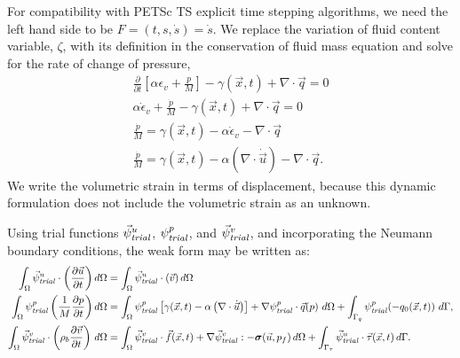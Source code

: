 For compatibility with PETSc TS explicit time stepping algorithms, we
need the left hand side to be $F = (t,s,\dot{s}) = \dot{s}$. We
replace the variation of fluid content variable, $\zeta$, with its
definition in the conservation of fluid mass equation and solve for
the rate of change of pressure,
\begin{gather}
  \frac{\partial}{\partial t}\left[\alpha \epsilon_{v} + \frac{p}{M}\right] - \gamma\left(\vec{x},t\right) + \nabla \cdot \vec{q} = 0 \\
  \alpha \dot{\epsilon}_{v} + \frac{\dot{p}}{M} - \gamma \left(\vec{x},t\right) + \nabla \cdot \vec{q} = 0 \\
  \frac{\dot{p}}{M} = \gamma \left(\vec{x},t \right) - \alpha \dot{\epsilon}_{v} -\nabla \cdot \vec{q} \\
  \frac{\dot{p}}{M} = \gamma \left(\vec{x},t \right) - \alpha \left( \nabla \cdot \dot{\vec{u}} \right) -\nabla \cdot \vec{q}.
\end{gather}
We write the volumetric strain in terms of displacement, because this
dynamic formulation does not include the volumetric strain as an
unknown.

Using trial functions $\trialvec[u]$, $\trialscalar[p]$, and $\trialvec[v]$, and incorporating the
Neumann boundary conditions, the weak form may be written as:
\begin{align}
  \int_{\Omega} \trialvec[u] \cdot \left( \frac{\partial \vec{u}}{\partial t} \right)d \Omega   & = \int_{\Omega} \trialvec[u] \cdot \left( \vec{v} \right) d \Omega          \\
  \int_{\Omega} \trialscalar[p] \left( \frac{1}{M}\frac{\partial p}{\partial t} \right) d\Omega & =
  \int_{\Omega} \trialscalar[p] \left[\gamma(\vec{x},t) - \alpha \left(\nabla \cdot \dot{\vec{u}}\right) \right]  + \nabla \trialscalar[p] \cdot \vec{q}(p) \ d\Omega +
  \int_{\Gamma_q} \trialscalar[p] (-q_0(\vec{x},t)) \ d\Gamma,                                                                                                                \\
  \int_\Omega \trialvec[v] \cdot \left( \rho_{b} \frac{\partial
    \vec{v}}{\partial t} \right) \,
  d\Omega                                                                                       & = \int_\Omega \trialvec[v] \cdot \vec{f}(\vec{x},t) + \nabla \trialvec[v] :
  -\tensor{\sigma} (\vec{u},p_f) \, d\Omega + \int_{\Gamma_\tau} \trialvec[u]
  \cdot \vec{\tau}(\vec{x},t) \, d\Gamma.
\end{align}



